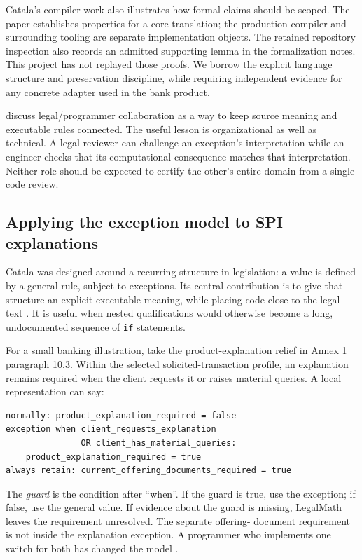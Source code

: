 \documentclass[12pt,a4paper,oneside,openany]{book}
\begin{document}
Catala's compiler work also illustrates how formal claims should be scoped.
The paper establishes properties for a core translation; the production
compiler and surrounding tooling are separate implementation objects. The
retained repository inspection also records an admitted supporting lemma in
the formalization notes. This project has not replayed those proofs. We borrow
the explicit language structure and preservation discipline, while requiring
independent evidence for any concrete adapter used in the bank product.

\citet[sec.~4.2]{huttner2022} discuss legal/programmer collaboration as a way
to keep source meaning and executable rules connected. The useful lesson is
organizational as well as technical. A legal reviewer can challenge an
exception's interpretation while an engineer checks that its computational
consequence matches that interpretation. Neither role should be expected to
certify the other's entire domain from a single code review.

\subsection{Applying the exception model to SPI explanations}
\label{merge:P-01a-language-lesson:02}


Catala was designed around a recurring structure in legislation: a value is
defined by a general rule, subject to exceptions. Its central contribution is
to give that structure an explicit executable meaning, while placing code close
to the legal text \citep[secs.~2--4]{catala2021}. It is useful when nested
qualifications would otherwise become a long, undocumented sequence of
\texttt{if} statements.

For a small banking illustration, take the product-explanation relief in Annex
1 paragraph 10.3. Within the selected solicited-transaction profile, an
explanation remains required when the client requests it or raises material
queries. A local representation can say:
\begin{lstlisting}[caption={An exception with an explicit guard. The combined guard avoids creating two competing exceptions for the same requirement.}]
normally: product_explanation_required = false
exception when client_requests_explanation
               OR client_has_material_queries:
    product_explanation_required = true
always retain: current_offering_documents_required = true
\end{lstlisting}
The \emph{guard} is the condition after ``when''. If the guard is true, use the
exception; if false, use the general value. If evidence about the guard is
missing, LegalMath leaves the requirement unresolved. The separate offering-
document requirement is not inside the explanation exception. A programmer
who implements one switch for both has changed the model
\citep[Annex 1, para.~10.3]{sfcspiannex1}.
\end{document}
